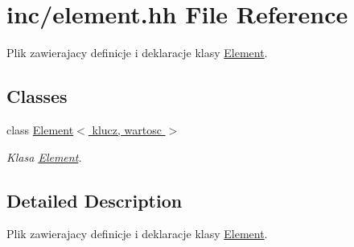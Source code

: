 \hypertarget{element_8hh}{\section{inc/element.hh File Reference}
\label{element_8hh}
}


Plik zawierajacy definicje i deklaracje klasy \hyperlink{class_element}{Element}.  


\subsection*{Classes}
\begin{DoxyCompactItemize}
\item 
class \hyperlink{class_element}{Element$<$ klucz, wartosc $>$}
\begin{DoxyCompactList}\small\item\em Klasa \hyperlink{class_element}{Element}. \end{DoxyCompactList}\end{DoxyCompactItemize}


\subsection{Detailed Description}
Plik zawierajacy definicje i deklaracje klasy \hyperlink{class_element}{Element}. 

